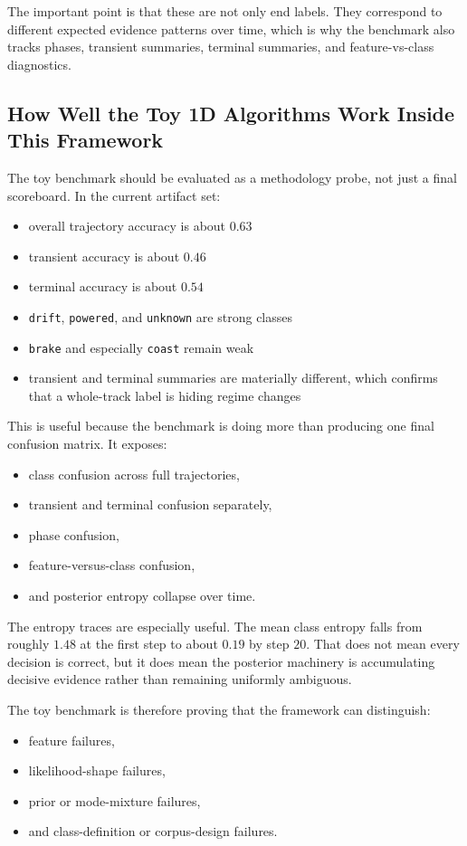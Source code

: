 \documentclass[11pt]{article}
\begin{document}
The important point is that these are not only end labels. They correspond to
different expected evidence patterns over time, which is why the benchmark also
tracks phases, transient summaries, terminal summaries, and feature-vs-class
diagnostics.

\subsection{How Well the Toy 1D Algorithms Work Inside This Framework}

The toy benchmark should be evaluated as a methodology probe, not just a final
scoreboard. In the current artifact set:
\begin{itemize}[leftmargin=1.5em]
    \item overall trajectory accuracy is about $0.63$
    \item transient accuracy is about $0.46$
    \item terminal accuracy is about $0.54$
    \item \texttt{drift}, \texttt{powered}, and \texttt{unknown} are strong
    classes
    \item \texttt{brake} and especially \texttt{coast} remain weak
    \item transient and terminal summaries are materially different, which
    confirms that a whole-track label is hiding regime changes
\end{itemize}

This is useful because the benchmark is doing more than producing one final
confusion matrix. It exposes:
\begin{itemize}[leftmargin=1.5em]
    \item class confusion across full trajectories,
    \item transient and terminal confusion separately,
    \item phase confusion,
    \item feature-versus-class confusion,
    \item and posterior entropy collapse over time.
\end{itemize}

The entropy traces are especially useful. The mean class entropy falls from
roughly $1.48$ at the first step to about $0.19$ by step $20$. That does not
mean every decision is correct, but it does mean the posterior machinery is
accumulating decisive evidence rather than remaining uniformly ambiguous.

The toy benchmark is therefore proving that the framework can distinguish:
\begin{itemize}[leftmargin=1.5em]
    \item feature failures,
    \item likelihood-shape failures,
    \item prior or mode-mixture failures,
    \item and class-definition or corpus-design failures.
\end{itemize}
\end{document}

